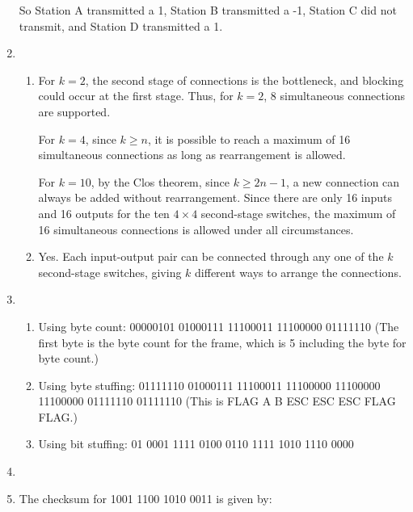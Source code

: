 \documentclass{article}
\begin{document}
\begin{enumerate}
So Station A transmitted a 1, Station B transmitted a -1, Station C did not transmit, and Station D transmitted a 1.

\item
\begin{enumerate}

\item For $k=2$, the second stage of connections is the bottleneck, and blocking could occur at the first stage. Thus, for $k=2$, 8 simultaneous connections are supported.

For $k=4$, since $k \geq n$, it is possible to reach a maximum of 16 simultaneous connections as long as rearrangement is allowed.

For $k=10$, by the Clos theorem, since $k \geq 2n-1$, a new connection can always be added without rearrangement. Since there are only 16 inputs and 16 outputs for the ten $4 \times 4$ second-stage switches, the maximum of 16 simultaneous connections is allowed under all circumstances.

\item Yes. Each input-output pair can be connected through any one of the $k$ second-stage switches, giving $k$ different ways to arrange the connections.

\end{enumerate}

\item
\begin{enumerate}

\item Using byte count:  00000101 01000111 11100011 11100000 01111110 (The first byte is the byte count for the frame, which is 5 including the byte for byte count.)

\item Using byte stuffing: 01111110 01000111 11100011 11100000 11100000 11100000 01111110 01111110
(This is FLAG A B ESC ESC ESC FLAG FLAG.) 

\item Using bit stuffing: 01 0001 1111 0100 0110 1111 1010 1110 0000

\end{enumerate}

\item 

\item The checksum for 1001 1100 1010 0011 is given by:


\end{enumerate}
\end{document}

